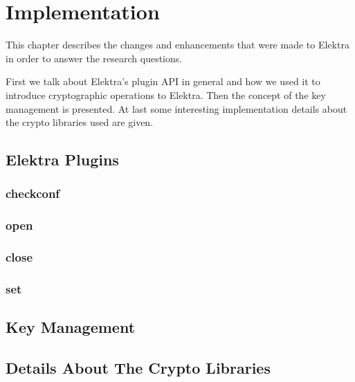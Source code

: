 \chapter{Implementation}

This chapter describes the changes and enhancements that were made to Elektra in order to answer the research questions.

First we talk about Elektra's plugin API in general and how we used it to introduce cryptographic operations to Elektra.
Then the concept of the key management is presented.
At last some interesting implementation details about the crypto libraries used are given.

\section{Elektra Plugins}


    \subsection{checkconf}

    \subsection{open}

    \subsection{close}

    \subsection{set}




\section{Key Management}

\section{Details About The Crypto Libraries}
